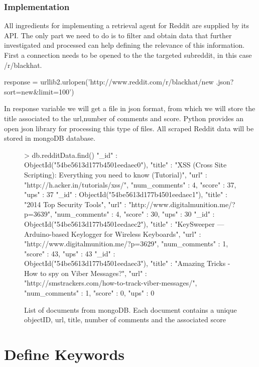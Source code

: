 \documentclass[12pt]{article}
\begin{document}
\subsubsection{Implementation}

All ingredients for implementing a retrieval agent for Reddit are supplied by its API. The only part we need to do is to filter and obtain data that further investigated and processed can help defining the relevance of this information. First a connection needs to be opened to the the targeted subreddit, in this case /r/blackhat. 
\begin{spverbatim}
response = urllib2.urlopen('http://www.reddit.com/r/blackhat/new
			.json?sort=new&limit=100')
\end{spverbatim}
\hfill \break
In response variable we will get a file in json format, from which we will store the title associated to the url,number of comments and score. Python provides an open json library for processing this type of files. All scraped Reddit data will be stored in mongoDB database.

\begin{figure}[h!]
\begin{spverbatim}
> db.redditData.find()
{ "_id" : ObjectId("54be5613d177b4501eedaec0"), "title" : "XSS (Cross Site Scripting): Everything you need to know (Tutorial)", "url" : "http://h.acker.in/tutorials/xss/", "num_comments" : 4, "score" : 37, "ups" : 37 }
{ "_id" : ObjectId("54be5613d177b4501eedaec1"), "title" : "2014 Top Security Tools", "url" : "http://www.digitalmunition.me/?p=3639", "num_comments" : 4, "score" : 30, "ups" : 30 }
{ "_id" : ObjectId("54be5613d177b4501eedaec2"), "title" : "KeySweeper — Arduino-based Keylogger for Wireless Keyboards", "url" : "http://www.digitalmunition.me/?p=3629", "num_comments" : 1, "score" : 43, "ups" : 43 }
{ "_id" : ObjectId("54be5613d177b4501eedaec3"), "title" : "Amazing Tricks - How to spy on Viber Messages?", "url" : "http://smstrackers.com/how-to-track-viber-messages/", "num_comments" : 1, "score" : 0, "ups" : 0 }
\end{spverbatim}
\captionsetup{font=small}
\caption{List of documents from mongoDB. Each document contains a unique objectID, url, title, number of comments and the associated score  }
\end{figure}

\newpage
\section{Define Keywords}
\end{document}
